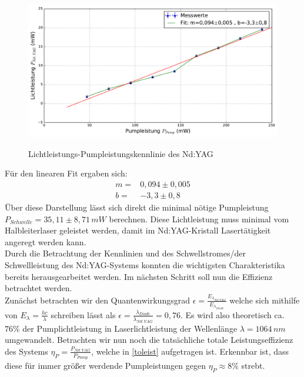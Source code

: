 \documentclass[twoside,colorback,accentcolor=tud4c,11pt]{tudreport}
\begin{document}
\begin{figure}[H]
\centering
   	\begin{minipage}[b]{0.9\textwidth}
   	\includegraphics[width=\textwidth]{graphics/kenn_ndyag_pl.pdf}
  	\label{kenyag2}
   	\end{minipage}
\caption{Lichtleistungs-Pumpleistungskennlinie des Nd:YAG}	
\end{figure}
Für den linearen Fit ergaben sich:
\begin{align}
m=& 0,094 \pm 0,005\\
b=& -3,3 \pm 0,8
\end{align}
Über diese Darstellung lässt sich direkt die minimal nötige Pumpleistung $P_{Schwelle}=35,11\pm 8,71\,\si{mW} $ berechnen. Diese Lichtleistung muss minimal vom Halbleiterlaser geleistet werden, damit im Nd:YAG-Kristall Lasertätigkeit angeregt werden kann.\\
Durch die Betrachtung der Kennlinien und des Schwellstromes/der Schwellleistung des Nd:YAG-Systems konnten die wichtigsten Charakteristika bereits herausgearbeitet werden. Im nächsten Schritt soll nun die Effizienz betrachtet werden.\\
Zunächst betrachten wir den Quantenwirkungsgrad $\epsilon=\frac{E_{\lambda_{Nd:YAG}}}{E_{\lambda_{Diode}}}$ welche sich mithilfe von $E_{\lambda}=\frac{hc}{\lambda}$ schreiben lässt als $\epsilon=\frac{\lambda_{Diode}}{\lambda_{Nd:YAG}}=0,76$. Es wird also theoretisch ca. $76\%$ der Pumplichtleistung in Laserlichtleistung der Wellenlänge $\lambda=1064\,\si{nm}$ umgewandelt. Betrachten wir nun noch die tatsächliche totale Leistungseffizienz des Systems $\eta_{P}=\frac{P_{Nd:YAG}}{P_{Pump}}$, welche in \ref{toleist} aufgetragen ist. Erkennbar ist, dass diese für immer größer werdende Pumpleistungen gegen $\eta_{P}\approx 8\%$ strebt.
\end{document}
